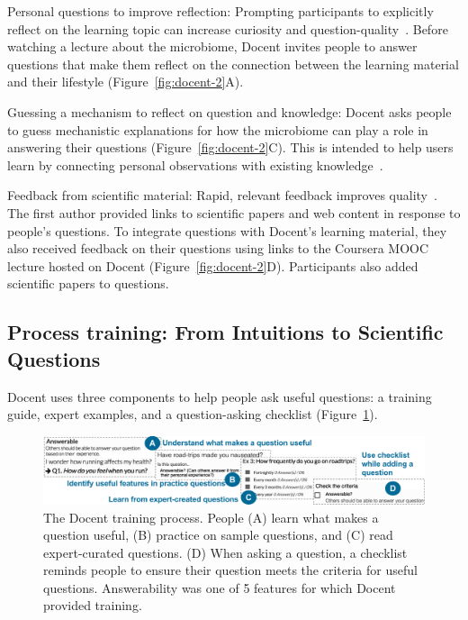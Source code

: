 Personal questions to improve reflection: Prompting participants to explicitly reflect on the learning topic can increase curiosity and question-quality~\cite{Aleven2006, Law2016}. Before watching a lecture about the microbiome, Docent invites people to answer questions that make them reflect on the connection between the learning material and their lifestyle (Figure~\ref{fig:docent-2}A).

Guessing a mechanism to reflect on question and knowledge: Docent asks people to guess mechanistic explanations for how the microbiome can play a role in answering their questions (Figure~\ref{fig:docent-2}C). This is intended to help users learn by connecting personal observations with existing knowledge~\cite{Simon2004}.

Feedback from scientific material: Rapid, relevant feedback improves quality~\cite{Hattie2007}. The first author provided links to scientific papers and web content in response to people’s questions. To integrate questions with Docent’s learning material, they also received feedback on their questions using links to the Coursera MOOC lecture hosted on Docent (Figure~\ref{fig:docent-2}D). Participants also added scientific papers to questions. 

\subsection{Process training: From Intuitions to Scientific Questions}
Docent uses three components to help people ask useful questions: a training guide, expert examples, and a question-asking checklist (Figure~\ref{fig:docent-3}). 

\begin{figure}[b] 
  \centering
  \includegraphics[width=1.0\textwidth]{figures/docent/fig-3.png}
  \caption[The Docent training process]
{The Docent training process. People (A) learn what makes a question useful, (B) practice on sample questions, and (C) read expert-curated questions. (D) When asking a question, a checklist reminds people to ensure their question meets the criteria for useful questions. Answerability was one of 5 features for which Docent provided training.}
  \label{fig:docent-3}
\end{figure}

